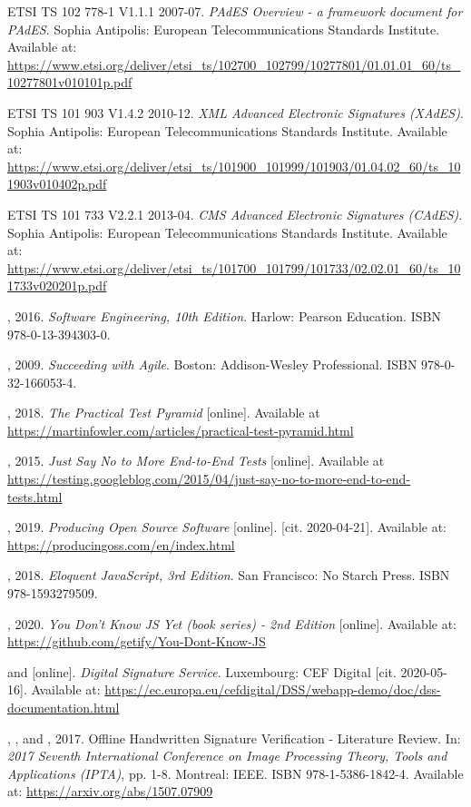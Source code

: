 \documentclass[thesismargins, english, thesislinespacing, onelinechapterstyle, upjsfrontpage]{rnthesis}
\begin{document}
\begin{thebibliography}{9}
  ETSI TS 102 778-1 V1.1.1 2007-07. \emph{PAdES Overview - a framework document for PAdES}. Sophia Antipolis: European Telecommunications Standards Institute. Available at: \url{https://www.etsi.org/deliver/etsi_ts/102700_102799/10277801/01.01.01_60/ts_10277801v010101p.pdf}

  ETSI TS 101 903 V1.4.2 2010-12. \emph{XML Advanced Electronic Signatures (XAdES)}. Sophia Antipolis: European Telecommunications Standards Institute. Available at: \url{https://www.etsi.org/deliver/etsi_ts/101900_101999/101903/01.04.02_60/ts_101903v010402p.pdf}

  ETSI TS 101 733 V2.2.1 2013-04. \emph{CMS Advanced Electronic Signatures (CAdES)}. Sophia Antipolis: European Telecommunications Standards Institute. Available at: \url{https://www.etsi.org/deliver/etsi_ts/101700_101799/101733/02.02.01_60/ts_101733v020201p.pdf}

  , 2016. \emph{Software Engineering, 10th Edition}. Harlow: Pearson Education. ISBN 978-0-13-394303-0.

  , 2009. \emph{Succeeding with Agile}. Boston: Addison-Wesley Professional. ISBN 978-0-32-166053-4.

  , 2018. \emph{The Practical Test Pyramid} [online]. Available at \url{https://martinfowler.com/articles/practical-test-pyramid.html}

  , 2015. \emph{Just Say No to More End-to-End Tests} [online]. Available at \url{https://testing.googleblog.com/2015/04/just-say-no-to-more-end-to-end-tests.html}

  , 2019. \emph{Producing Open Source Software} [online]. [cit. 2020-04-21]. Available at: \url{https://producingoss.com/en/index.html}

  , 2018. \emph{Eloquent JavaScript, 3rd Edition}. San Francisco: No Starch Press. ISBN 978-1593279509.

  , 2020. \emph{You Don't Know JS Yet (book series) - 2nd Edition} [online]. Available at: \url{https://github.com/getify/You-Dont-Know-JS}

   and  [online]. \emph{Digital Signature Service}. Luxembourg: CEF Digital [cit. 2020-05-16]. Available at: \url{https://ec.europa.eu/cefdigital/DSS/webapp-demo/doc/dss-documentation.html}

  , , and , 2017. Offline Handwritten Signature Verification - Literature Review. In: \emph{2017 Seventh International Conference on Image Processing Theory, Tools and Applications (IPTA)}, pp. 1-8. Montreal: IEEE. ISBN 978-1-5386-1842-4. Available at: \url{https://arxiv.org/abs/1507.07909}

\end{thebibliography}
\end{document}
